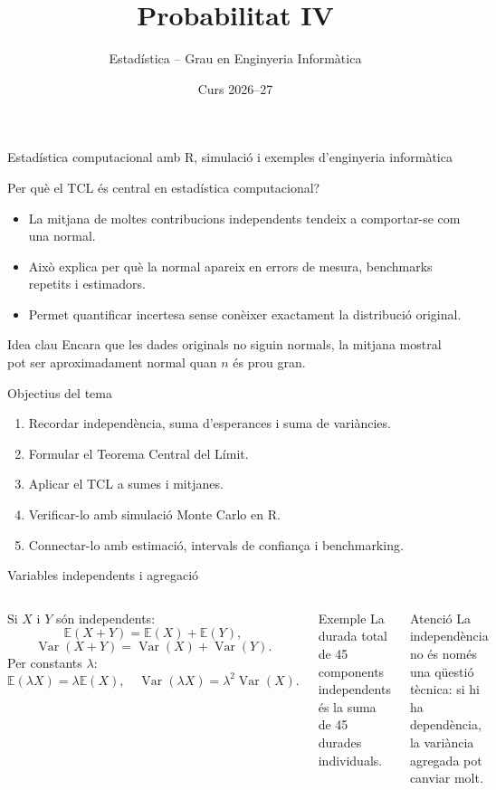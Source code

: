 \documentclass[10pt,aspectratio=169]{beamer}
\title[Probabilitat IV]{Probabilitat IV}
\author{Estadística -- Grau en Enginyeria Informàtica}
\date{Curs 2026--27}
\newcommand{\R}{\textsf{R}}
\newcommand{\E}{\mathbb{E}}
\newcommand{\Var}{\operatorname{Var}}
\begin{document}
\begin{frame}[plain]
  \titlepage
  \vspace{-0.45cm}
  \begin{center}
  \small\textcolor{DeepBlue}{Estadística computacional amb \R, simulació i exemples d'enginyeria informàtica}
  \end{center}
\end{frame}


\begin{frame}[fragile]{Per què el TCL és central en estadística computacional?}
\begin{itemize}
  \item La mitjana de moltes contribucions independents tendeix a comportar-se com una normal.
  \item Això explica per què la normal apareix en errors de mesura, benchmarks repetits i estimadors.
  \item Permet quantificar incertesa sense conèixer exactament la distribució original.
\end{itemize}
\begin{block}{Idea clau}
Encara que les dades originals no siguin normals, la mitjana mostral pot ser aproximadament normal quan $n$ és prou gran.
\end{block}
\end{frame}

\begin{frame}[fragile]{Objectius del tema}
\begin{enumerate}
  \item Recordar independència, suma d'esperances i suma de variàncies.
  \item Formular el Teorema Central del Límit.
  \item Aplicar el TCL a sumes i mitjanes.
  \item Verificar-lo amb simulació Monte Carlo en \R.
  \item Connectar-lo amb estimació, intervals de confiança i benchmarking.
\end{enumerate}
\end{frame}

\begin{frame}[fragile]{Variables independents i agregació}
\begin{columns}[T]
Si $X$ i $Y$ són independents:
\[
\E(X+Y)=\E(X)+\E(Y),
\]
\[
\Var(X+Y)=\Var(X)+\Var(Y).
\]
Per constants $\lambda$:
\[
\E(\lambda X)=\lambda\E(X),\quad
\Var(\lambda X)=\lambda^2\Var(X).
\]
\begin{block}{Exemple}
La durada total de 45 components independents és la suma de 45 durades individuals.
\end{block}
\begin{alertblock}{Atenció}
La independència no és només una qüestió tècnica: si hi ha dependència, la variància agregada pot canviar molt.
\end{alertblock}
\end{columns}
\end{frame}
\end{document}
